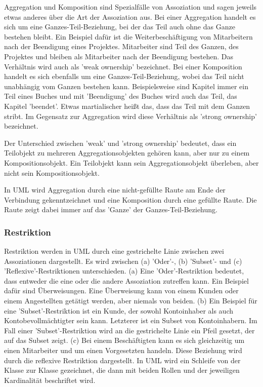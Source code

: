 Aggregation und Komposition sind Spezialfälle von Assoziation und sagen jeweils etwas anderes über die Art der Assoziation aus. Bei einer Aggregation handelt es sich um eine Ganzes-Teil-Beziehung, bei der das Teil auch ohne das Ganze bestehen bleibt. Ein Beispiel dafür ist die Weiterbeschäftigung von Mitarbeitern nach der Beendigung eines Projektes. Mitarbeiter sind Teil des Ganzen, des Projektes und bleiben als Mitarbeiter nach der Beendigung bestehen. Das Verhältnis wird auch als 'weak ownership' bezeichnet. Bei einer Komposition handelt es sich ebenfalls um eine Ganzes-Teil-Beziehung, wobei das Teil nicht unabhängig vom Ganzen bestehen kann. Beispielsweise sind Kapitel immer ein Teil eines Buches und mit 'Beendigung' des Buches wird auch das Teil, das Kapitel 'beendet'. Etwas martialischer heißt das, dass das Teil mit dem Ganzen stribt. Im Gegensatz zur Aggregation wird diese Verhältnis als 'strong ownership' bezeichnet.

Der Unterschied zwischen 'weak' und 'strong ownership' bedeutet, dass ein Teilobjekt zu mehreren Aggregationsobjekten gehören kann, aber nur zu einem Kompositionsobjekt. Ein Teilobjekt kann sein Aggregationsobjekt überleben, aber nicht sein Kompositionsobjekt.

In UML wird Aggregation durch eine nicht-gefüllte Raute am Ende der Verbindung gekenntzeichnet und eine Komposition durch eine gefüllte Raute. Die Raute zeigt dabei immer auf das 'Ganze' der Ganzes-Teil-Beziehung.

\subsubsection{Restriktion}

Restriktion werden in UML durch eine gestrichelte Linie zwischen zwei Assoziationen dargestellt. Es wird zwischen (a) 'Oder'-, (b) 'Subset'- und (c) 'Reflexive'-Restriktionen unterschieden. (a) Eine 'Oder'-Restriktion bedeutet, dass entweder die eine oder die andere Assoziation zutreffen kann. Ein Beispiel dafür sind Überweisungen. Eine Überweisung kann von einem Kunden oder einem Angestellten getätigt werden, aber niemals von beiden. (b) Ein Beispiel für eine 'Subset'-Restriktion ist ein Kunde, der sowohl Kontoinhaber als auch Kontobevollmächtigter sein kann. Letzterer ist ein Subset von Kontoinhabern. Im Fall einer 'Subset'-Restriktion wird an die gestrichelte Linie ein Pfeil gesetzt, der auf das Subset zeigt. (c) Bei einem Beschäftigten kann es sich gleichzeitig um einen Mitarbeiter und um einen Vorgesetzten handeln. Diese Beziehung wird durch die reflexive Restriktion dargestellt. In UML wird ein Schleife von der Klasse zur Klasse gezeichnet, die dann mit beiden Rollen und der jeweiligen Kardinalität beschriftet wird.

